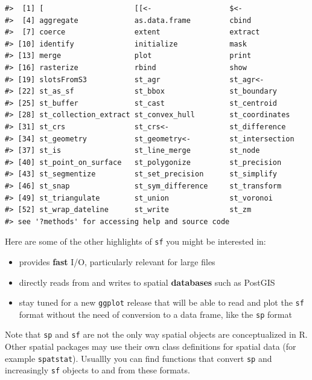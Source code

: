 \documentclass[]{book}
\theoremstyle{definition}
\theoremstyle{definition}
\theoremstyle{definition}
\theoremstyle{remark}
\begin{document}
\begin{verbatim}
#>  [1] [                     [[<-                  $<-                  
#>  [4] aggregate             as.data.frame         cbind                
#>  [7] coerce                extent                extract              
#> [10] identify              initialize            mask                 
#> [13] merge                 plot                  print                
#> [16] rasterize             rbind                 show                 
#> [19] slotsFromS3           st_agr                st_agr<-             
#> [22] st_as_sf              st_bbox               st_boundary          
#> [25] st_buffer             st_cast               st_centroid          
#> [28] st_collection_extract st_convex_hull        st_coordinates       
#> [31] st_crs                st_crs<-              st_difference        
#> [34] st_geometry           st_geometry<-         st_intersection      
#> [37] st_is                 st_line_merge         st_node              
#> [40] st_point_on_surface   st_polygonize         st_precision         
#> [43] st_segmentize         st_set_precision      st_simplify          
#> [46] st_snap               st_sym_difference     st_transform         
#> [49] st_triangulate        st_union              st_voronoi           
#> [52] st_wrap_dateline      st_write              st_zm                
#> see '?methods' for accessing help and source code
\end{verbatim}

Here are some of the other highlights of \texttt{sf} you might be
interested in:

\begin{itemize}
\item
  provides \textbf{fast} I/O, particularly relevant for large files
\item
  directly reads from and writes to spatial \textbf{databases} such as
  PostGIS
\item
  stay tuned for a new \texttt{ggplot} release that will be able to read
  and plot the \texttt{sf} format without the need of conversion to a
  data frame, like the \texttt{sp} format
\end{itemize}

Note that \texttt{sp} and \texttt{sf} are not the only way spatial
objects are conceptualized in R. Other spatial packages may use their
own class definitions for spatial data (for example \texttt{spatstat}).
Usuallly you can find functions that convert \texttt{sp} and
increasingly \texttt{sf} objects to and from these formats.
\end{document}
